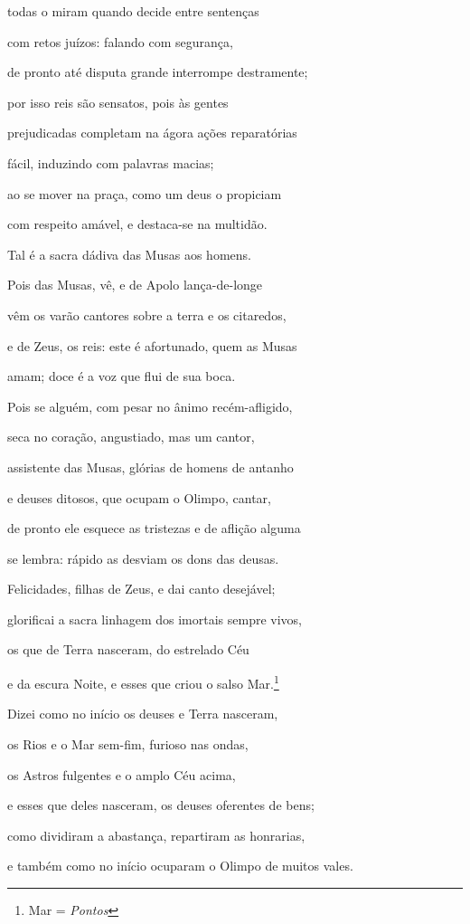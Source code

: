 \begin{pages}
\begin{Rightside}
todas o miram quando decide entre sentenças 

com retos juízos: falando com segurança,

de pronto até disputa grande interrompe destramente;

por isso reis são sensatos, pois às gentes

prejudicadas completam na ágora ações reparatórias

fácil, induzindo com palavras macias; 

ao se mover na praça, como um deus o propiciam

com respeito amável, e destaca-se na multidão.

\quad{}Tal é a sacra dádiva das Musas aos homens.

Pois das Musas, vê, e de Apolo lança-de-longe

vêm os varão cantores sobre a terra e os citaredos, 

e de Zeus, os reis: este é afortunado, quem as Musas

amam; doce é a voz que flui de sua boca.

Pois se alguém, com pesar no ânimo recém-afligido,

seca no coração, angustiado, mas um cantor,

assistente das Musas, glórias de homens de antanho 

e deuses ditosos, que ocupam o Olimpo, cantar,

de pronto ele esquece as tristezas e de aflição alguma

se lembra: rápido as desviam os dons das deusas.

\quad{}Felicidades, filhas de Zeus, e dai canto desejável;

glorificai a sacra linhagem dos imortais sempre vivos, 

os que de Terra nasceram, do estrelado Céu

e da escura Noite, e esses que criou o salso Mar.\footnote{Mar = \emph{Pontos}}

Dizei como no início os deuses e Terra nasceram,

os Rios e o Mar sem-fim, furioso nas ondas,

os Astros fulgentes e o amplo Céu acima, 

e esses que deles nasceram, os deuses oferentes de bens;

como dividiram a abastança, repartiram as honrarias,

e também como no início ocuparam o Olimpo de muitos vales.


\end{Rightside}
\end{pages}

